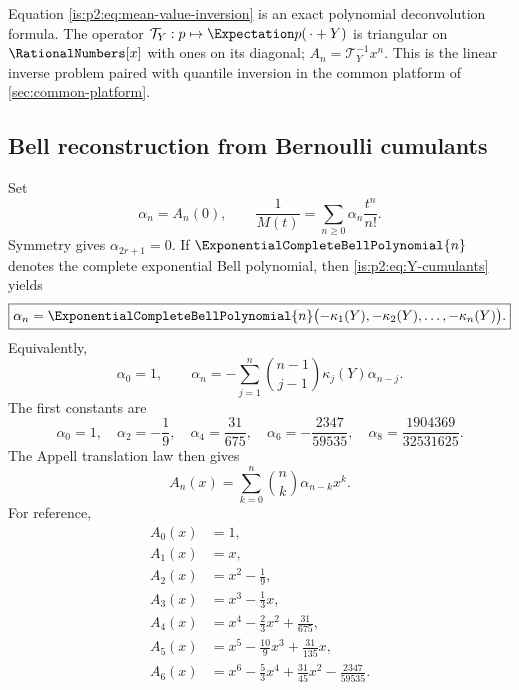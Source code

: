 \begin{remark}
Equation \eqref{is:p2:eq:mean-value-inversion} is an exact polynomial deconvolution formula.  The operator
$\mathcal T_Y:p\mapsto\Expectation p(\,\cdot+Y)$ is triangular on $\RationalNumbers[x]$ with ones on its diagonal;
$A_n=\mathcal T_Y^{-1}x^n$.  This is the linear inverse problem paired with
quantile inversion in the common platform of \cref{sec:common-platform}.
\end{remark}

\subsection{Bell reconstruction from Bernoulli cumulants}

Set
\begin{equation}
 \alpha_n=A_n(0),
 \qquad
 \frac1{M(t)}=\sum_{n\ge0}\alpha_n\frac{t^n}{n!}.
 \label{is:p2:eq:alpha-def}
\end{equation}
Symmetry gives $\alpha_{2r+1}=0$.  If $\ExponentialCompleteBellPolynomial{n}$ denotes the complete exponential Bell polynomial,
then \eqref{is:p2:eq:Y-cumulants} yields
\begin{equation}
 \boxed{
 \alpha_n=\ExponentialCompleteBellPolynomial{n}\bigl(-\kappa_1(Y),-\kappa_2(Y),\ldots,-\kappa_n(Y)\bigr).
 }
 \label{is:p2:eq:alpha-Bell}
\end{equation}
Equivalently,
\begin{equation}
 \alpha_0=1,
 \qquad
 \alpha_n=-\sum_{j=1}^n\binom{n-1}{j-1}\kappa_j(Y)\alpha_{n-j}.
 \label{is:p2:eq:alpha-recurrence}
\end{equation}
The first constants are
\begin{equation}
 \alpha_0=1,
 \quad \alpha_2=-\frac19,
 \quad \alpha_4=\frac{31}{675},
 \quad \alpha_6=-\frac{2347}{59535},
 \quad \alpha_8=\frac{1904369}{32531625}.
 \label{is:p2:eq:alpha-first}
\end{equation}
The Appell translation law then gives
\begin{equation}
 A_n(x)=\sum_{k=0}^n\binom nk\alpha_{n-k}x^k.
 \label{is:p2:eq:A-from-alpha}
\end{equation}
For reference,
\begin{equation}
\begin{aligned}
 A_0(x)&=1,\\
 A_1(x)&=x,\\
 A_2(x)&=x^2-\frac19,\\
 A_3(x)&=x^3-\frac13x,\\
 A_4(x)&=x^4-\frac23x^2+\frac{31}{675},\\
 A_5(x)&=x^5-\frac{10}{9}x^3+\frac{31}{135}x,\\
 A_6(x)&=x^6-\frac53x^4+\frac{31}{45}x^2-\frac{2347}{59535}.
\end{aligned}
\label{is:p2:eq:A-first-polys}
\end{equation}
